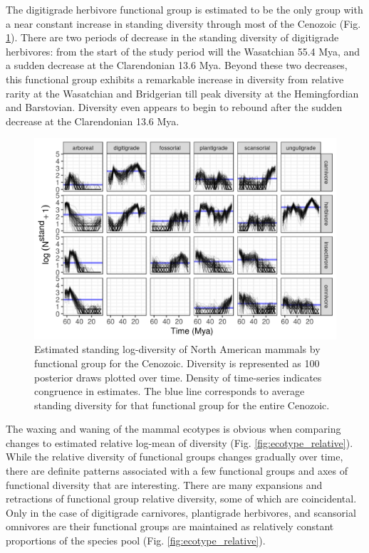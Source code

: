 \documentclass[12pt,letterpaper]{article}
\begin{document}
The digitigrade herbivore functional group is estimated to be the only group with a near constant increase in standing diversity through most of the Cenozoic (Fig. \ref{fig:ecotype_diversity}). There are two periods of decrease in the standing diversity of digitigrade herbivores: from the start of the study period will the Wasatchian 55.4 Mya, and a sudden decrease at the Clarendonian 13.6 Mya. Beyond these two decreases, this functional group exhibits a remarkable increase in diversity from relative rarity at the Wasatchian and Bridgerian till peak diversity at the Hemingfordian and Barstovian. Diversity even appears to begin to rebound after the sudden decrease at the Clarendonian 13.6 Mya.
\begin{figure}[ht]
  \centering
  \includegraphics[width=\textwidth,height=0.5\textheight,keepaspectratio=true]{figure/ecotype_diversity}
  \caption{Estimated standing log-diversity of North American mammals by functional group for the Cenozoic. Diversity is represented as 100 posterior draws plotted over time. Density of time-series indicates congruence in estimates. The blue line corresponds to average standing diversity for that functional group for the entire Cenozoic.} 
  \label{fig:ecotype_diversity}
\end{figure}



The waxing and waning of the mammal ecotypes is obvious when comparing changes to estimated relative log-mean of diversity (Fig. \ref{fig:ecotype_relative}). While the relative diversity of functional groups changes gradually over time, there are definite patterns associated with a few functional groups and axes of functional diversity that are interesting. There are many expansions and retractions of functional group relative diversity, some of which are coincidental. Only in the case of digitigrade carnivores, plantigrade herbivores, and scansorial omnivores are their functional groups are maintained as relatively constant proportions of the species pool (Fig. \ref{fig:ecotype_relative}).
\end{document}
